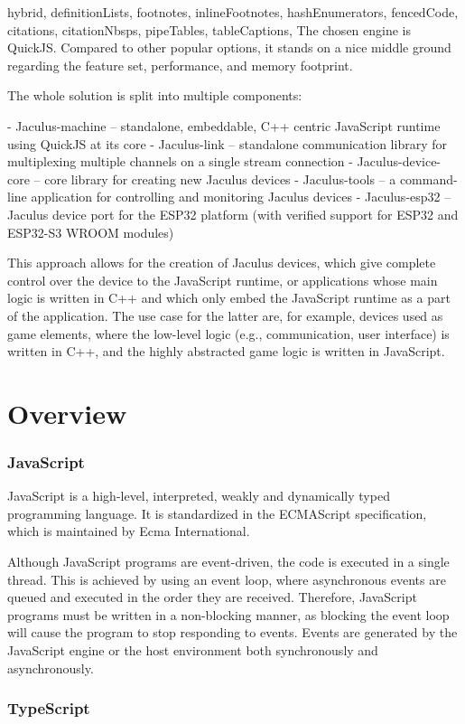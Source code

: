 \documentclass[
  digital,
  oneside,
  nosansbold,
  nocolorbold,
  lof,
  lot
]{fithesis4}
\begin{document}
\begin{markdown*}{%
  hybrid,
  definitionLists,
  footnotes,
  inlineFootnotes,
  hashEnumerators,
  fencedCode,
  citations,
  citationNbsps,
  pipeTables,
  tableCaptions,
}
The chosen engine is QuickJS. Compared to other popular options, it stands on a nice middle ground regarding the feature set, performance, and memory footprint.

The whole solution is split into multiple components:

  - Jaculus-machine -- standalone, embeddable, C++ centric JavaScript runtime using QuickJS at its core
  - Jaculus-link -- standalone communication library for multiplexing multiple channels on a single stream connection
  - Jaculus-device-core -- core library for creating new Jaculus devices
  - Jaculus-tools -- a command-line application for controlling and monitoring Jaculus devices
  - Jaculus-esp32 -- Jaculus device port for the ESP32 platform (with verified support for ESP32 and ESP32-S3 WROOM modules)

This approach allows for the creation of Jaculus devices, which give complete control over the device to the JavaScript runtime, or applications whose main logic is written in C++ and which only embed the JavaScript runtime as a part of the application. The use case for the latter are, for example, devices used as game elements, where the low-level logic (e.g., communication, user interface) is written in C++, and the highly abstracted game logic is written in JavaScript.


\chapter{Overview}

\subsection{JavaScript}

JavaScript is a high-level, interpreted, weakly and dynamically typed programming language. It is standardized in the ECMAScript specification, which is maintained by Ecma International.

Although JavaScript programs are event-driven, the code is executed in a single thread. This is achieved by using an event loop, where asynchronous events are queued and executed in the order they are received. Therefore, JavaScript programs must be written in a non-blocking manner, as blocking the event loop will cause the program to stop responding to events. Events are generated by the JavaScript engine or the host environment both synchronously and asynchronously.


\subsection{TypeScript}


\end{markdown*}
\end{document}
